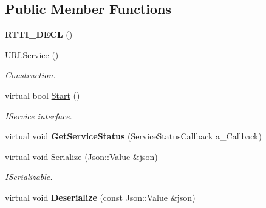 \subsection*{Public Member Functions}
\begin{DoxyCompactItemize}
\item 
\mbox{\label{class_u_r_l_service_af88dd746b3765b3a5a5e4aa92338ef98}} 
{\bfseries R\+T\+T\+I\+\_\+\+D\+E\+CL} ()
\item 
\mbox{\label{class_u_r_l_service_a19b9ecdd8282174944e75767fc55d22f}} 
\hyperlink{class_u_r_l_service_a19b9ecdd8282174944e75767fc55d22f}{U\+R\+L\+Service} ()
\begin{DoxyCompactList}\small\item\em Construction. \end{DoxyCompactList}\item 
\mbox{\label{class_u_r_l_service_ade34a612b8682b2ea618e46dc91dd890}} 
virtual bool \hyperlink{class_u_r_l_service_ade34a612b8682b2ea618e46dc91dd890}{Start} ()
\begin{DoxyCompactList}\small\item\em I\+Service interface. \end{DoxyCompactList}\item 
\mbox{\label{class_u_r_l_service_abf67fe4ec5ffb8d87f27b6bb336b5c12}} 
virtual void {\bfseries Get\+Service\+Status} (Service\+Status\+Callback a\+\_\+\+Callback)
\item 
\mbox{\label{class_u_r_l_service_a970ef212b8ac0473d640f4ba0127655a}} 
virtual void \hyperlink{class_u_r_l_service_a970ef212b8ac0473d640f4ba0127655a}{Serialize} (Json\+::\+Value \&json)
\begin{DoxyCompactList}\small\item\em I\+Serializable. \end{DoxyCompactList}\item 
\mbox{\label{class_u_r_l_service_a8b183378c2ee545c8367455b24b2dc93}} 
virtual void {\bfseries Deserialize} (const Json\+::\+Value \&json)
\item 
\mbox{\label{class_u_r_l_service_ab15f5c5f61f7754abf0718ba1fcc7020}} 

\end{DoxyCompactItemize}
